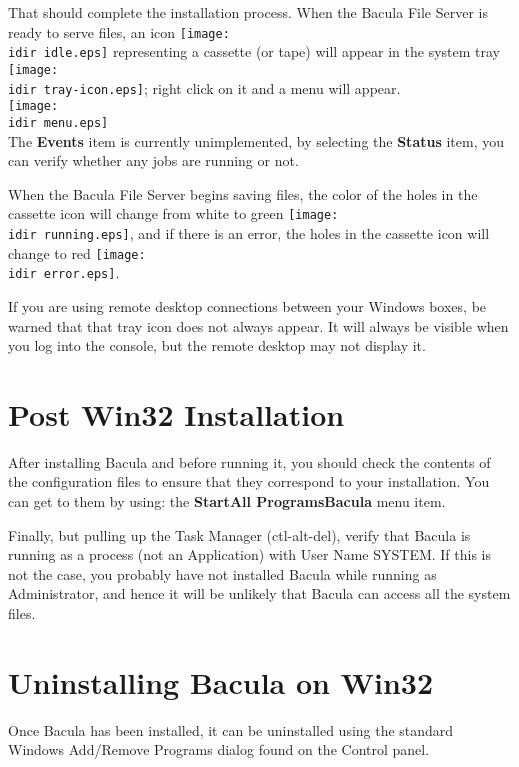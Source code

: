 That should complete the installation process. When the Bacula File Server is
ready to serve files, an icon \texttt{[image: \\idir idle.eps]} representing a
cassette (or tape) will appear in the system tray
\texttt{[image: \\idir tray-icon.eps]}; right click on it and a menu will appear.\\
\texttt{[image: \\idir menu.eps]}\\
The {\bf Events} item is currently unimplemented, by selecting the {\bf
Status} item, you can verify whether any jobs are running or not. 

When the Bacula File Server begins saving files, the color of the holes in the
cassette icon will change from white to green \texttt{[image: \\idir running.eps]},
and if there is an error, the holes in the cassette icon will change to red
\texttt{[image: \\idir error.eps]}. 

If you are using remote desktop connections between your Windows boxes, be
warned that that tray icon does not always appear. It will always be visible
when you log into the console, but the remote desktop may not display it. 

\section{Post Win32 Installation}

After installing Bacula and before running it, you should check the contents
of the configuration files to ensure that they correspond to your
installation.  You can get to them by using:
the {\bf Start\-\gt{}All Programs\-\gt{}Bacula} menu item.

Finally, but pulling up the Task Manager (ctl-alt-del), verify that Bacula
is running as a process (not an Application) with User Name SYSTEM. If this is 
not the case, you probably have not installed Bacula while running as
Administrator, and hence it will be unlikely that Bacula can access
all the system files.

\section{Uninstalling Bacula on Win32}

Once Bacula has been installed, it can be uninstalled using the standard
Windows Add/Remove Programs dialog found on the Control panel. 

